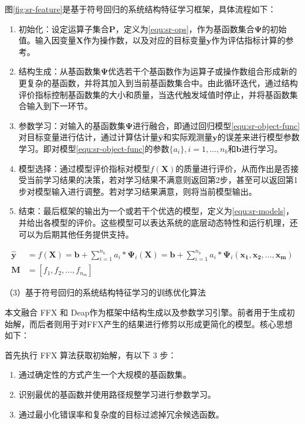 图\ref{fig:sr-feature}是基于符号回归的系统结构特征学习框架，具体流程如下：
\begin{enumerate}[1.]
  \item 初始化：设定运算子集合$\mathbf{P}$，定义为\ref{equ:sr-ops}，作为基函数集合$\mathbf{\Psi}$的初始值。输入因变量$\mathbf{X}$作为操作数，以及对应的目标变量$\mathbf{y}$作为评估指标计算的参考。
  \item 结构生成：从基函数集$\mathbf{\Psi}$优选若干个基函数作为运算子或操作数组合形成新的更复杂的基函数，并将其加入到当前基函数集合中。由此循环迭代，通过结构评价指标控制基函数集的大小和质量，当迭代触发域值时停止，并将基函数集合输入到下一环节。
  \item 参数学习：对输入的基函数集$\mathbf{\Psi}$进行融合，即通过回归模型\ref{equ:sr-object-func}对目标变量进行估计，通过计算估计量$\mathbf{\hat{y}}$和实际观测量$\mathbf{y}$的误差来进行模型参数学习。即对模型\ref{equ:sr-object-func}的参数$\{a_{i}\},i=1,...,n_{b}$和$\mathbf{b}$进行学习。
  \item 模型选择：通过模型评价指标对模型$f(\mathbf{X})$的质量进行评价，从而作出是否接受当前学习结果的决策，若对学习结果不满意则返回第2步，甚至可以返回第1步对模型输入进行调整。若对学习结果满意，则将当前模型输出。
  \item 结束：最后框架的输出为一个或若干个优选的模型，定义为\ref{equ:sr-models}，并给出各模型的评价。这些模型可以表达系统的底层动态特性和运行机理，还可以为后期其他任务提供支持。
\end{enumerate}
\begin{subequations}
\begin{align}
\mathbf{\hat{y}} &= f(\mathbf{X}) = \mathbf{b} + \sum_{i=1}^{n_{b}}a_{i} \ast \mathbf{\Psi}_{i}(\mathbf{X}) =  \mathbf{b} + \sum_{i=1}^{n_{b}}a_{i} \ast \mathbf{\Psi}_{i}(\mathbf{\mathbf{x_{1}}, \mathbf{x_{2}}, ..., \mathbf{x_{m}}}) \label{equ:sr-object-func} \\
\mathbf{M} &= [f_{1}, f_{2}, ..., f_{n_m}] \label{equ:sr-models} 
\end{align}
\end{subequations}

（3）基于符号回归的系统结构特征学习的训练优化算法

本文融合 FFX\cite{mcconaghy2011ffx} 和 Deap\cite{fortin2012deap}作为框架中结构生成以及参数学习引擎。前者用于生成初始解，而后者则用于对FFX产生的结果进行修剪以形成更简化的模型。核心思想如下：

首先执行 FFX 算法获取初始解，有以下 3 步：
\begin{enumerate}[1.]
      \item 通过确定性的方式产生一个大规模的基函数集。
      \item 识别最优的基函数并使用路径规整学习进行参数学习。
      \item 通过最小化错误率和复杂度的目标过滤掉冗余候选函数。
\end{enumerate}


